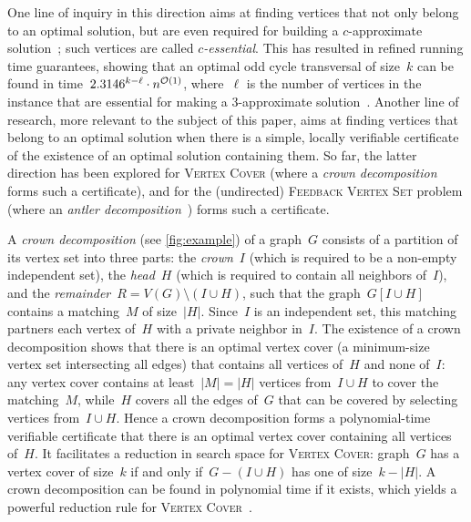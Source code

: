 One line of inquiry in this direction aims at finding vertices that not only belong to an optimal solution, but are even required for building a $c$-approximate solution~\cite{BumpusJK22,JansenV24}; such vertices are called \emph{$c$-essential}. This has resulted in refined running time guarantees, showing that an optimal odd cycle transversal of size~$k$ can be found in time~$2.3146^{k - \ell} \cdot n^{\mathcal{O}(1)}$, where~$\ell$ is the number of vertices in the instance that are essential for making a 3-approximate solution~\cite{BumpusJK22}. Another line of research, more relevant to the subject of this paper, aims at finding vertices that belong to an optimal solution when there is a simple, locally verifiable certificate of the existence of an optimal solution containing them. So far, the latter direction has been explored for \textsc{Vertex Cover} (where a \emph{crown decomposition}~\cite{Abu-KhzamFLS07,Fellows03} forms such a certificate), and for the (undirected) \textsc{Feedback Vertex Set} problem (where an \emph{antler decomposition}~\cite{DonkersJ24}) forms such a certificate. 



A \emph{crown decomposition} (see \cref{fig:example}) of a graph~$G$ consists of a partition of its vertex set into three parts: the \emph{crown}~$I$ (which is required to be a non-empty independent set), the \emph{head}~$H$ (which is required to contain all neighbors of~$I$), and the \emph{remainder}~$R = V(G) \setminus (I \cup H)$, such that the graph~$G[I \cup H]$ contains a matching~$M$ of size~$|H|$. Since~$I$ is an independent set, this matching partners each vertex of~$H$ with a private neighbor in~$I$. The existence of a crown decomposition shows that there is an optimal vertex cover (a minimum-size vertex set intersecting all edges) that contains all vertices of~$H$ and none of~$I$: any vertex cover contains at least~$|M| = |H|$ vertices from~$I \cup H$ to cover the matching~$M$, while~$H$ covers all the edges of~$G$ that can be covered by selecting vertices from~$I \cup H$. Hence a crown decomposition forms a polynomial-time verifiable certificate that there is an optimal vertex cover containing all vertices of~$H$. It facilitates a reduction in search space for \textsc{Vertex Cover}: graph~$G$ has a vertex cover of size~$k$ if and only if~$G - (I \cup H)$ has one of size~$k - |H|$. A crown decomposition can be found in polynomial time if it exists, which yields a powerful reduction rule for \textsc{Vertex Cover}~\cite{Abu-KhzamFLS07}.


